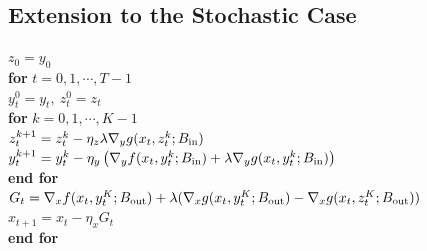 \documentclass[twoside,11pt]{article}
\begin{document}



{\subsection{Extension to the Stochastic Case }}


\begin{algorithm*}[t]  
\caption{F${}^2$BSA $(x_0,y_0)$} \label{alg:F2BSA}
\begin{algorithmic}[1] 
\STATE $ z_0 = y_0$ \\[1mm]
\STATE \textbf{for} $ t =0,1,\cdots,T-1 $ \\[1mm]
\STATE \quad $ y_t^0 =  y_{t}, ~ z_t^0 = z_{t}$ \\[1mm]
\STATE \quad \textbf{for} $ k =0,1,\cdots,K-1$ \\[1mm]
\STATE \quad \quad $ z_t^{k+1} = z_t^{k}- \eta_z \lambda \nabla_y g(x_t, z_t^k;B_{\rm in})   $ \\[1mm]
\STATE \quad \quad $ y_t^{k+1} = y_t^k - \eta_y \left( \nabla_y f(x_t,y_t^k;B_{\rm in}) +  \lambda  \nabla_y g(x_t,y_t^k;B_{\rm in}) \right)$ \\[1mm]
\STATE \quad \textbf{end for} \\[1mm]
\STATE \quad $ G_t= \nabla_x f(x_t,y_{t}^K;B_{\rm out}) + \lambda ( \nabla_x g(x_t,y_{t}^K;B_{\rm out}) - \nabla_x g(x_t,z_{t}^K;B_{\rm out}) )$ \\[1mm]
\STATE \quad  $x_{t+1} = x_t -  \eta_x G_t$ \\[1mm]
\STATE \textbf{end for} \\[1mm]
\end{algorithmic}
\end{algorithm*}
\end{document}
